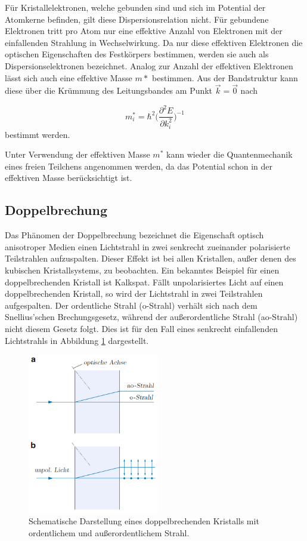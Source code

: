 Für Kristallelektronen, welche gebunden sind und sich im Potential der
Atomkerne befinden, gilt diese Dispersionsrelation nicht. Für gebundene
Elektronen tritt pro Atom nur eine effektive Anzahl von Elektronen mit der einfallenden
Strahlung in Wechselwirkung. Da nur diese effektiven Elektronen die optischen
Eigenschaften des Festkörpers bestimmen, werden sie auch als Dispersionselektronen
bezeichnet. Analog zur Anzahl der effektiven Elektronen lässt sich auch eine
effektive Masse $m*$ bestimmen. Aus der Bandstruktur kann diese über die Krümmung des
Leitungsbandes am Punkt $\vec{k}=\vec{0}$ nach

\begin{equation}
  m^*_i=\hbar^2\Big(\frac{\partial^2 E}{\partial k^2_i} \Big)^{-1}
\end{equation}
bestimmt werden.

Unter Verwendung der effektiven Masse $m^*$ kann wieder die Quantenmechanik eines
freien Teilchens angenommen werden, da das Potential schon in der effektiven Masse
berücksichtigt ist.

\subsection{Doppelbrechung}
Das Phänomen der Doppelbrechung bezeichnet die Eigenschaft optisch anisotroper Medien einen Lichtstrahl in
zwei senkrecht zueinander polarisierte Teilstrahlen aufzuspalten. Dieser Effekt ist bei allen Kristallen, außer
denen des kubischen Kristallsystems, zu beobachten. Ein bekanntes Beispiel für einen doppelbrechenden Kristall ist
Kalkspat.
Fällt unpolarisiertes Licht auf einen doppelbrechenden Kristall, so wird der
Lichtstrahl in zwei Teilstrahlen aufgespalten. Der ordentliche Strahl (o-Strahl)
verhält sich nach dem Snellius'schen Brechungsgesetz, während der außerordentliche Strahl
(ao-Strahl) nicht diesem Gesetz folgt. Dies ist für den Fall eines senkrecht
einfallenden Lichtstrahls in Abbildung \ref{fig:Doppelbrechend} dargestellt.

\begin{figure}[H]
  \centering
  \includegraphics[height=7cm]{Doppelbrechend.png}
  \caption{Schematische Darstellung eines doppelbrechenden Kristalls mit ordentlichem und außerordentlichem Strahl.}
  \label{fig:Doppelbrechend}
\end{figure}

